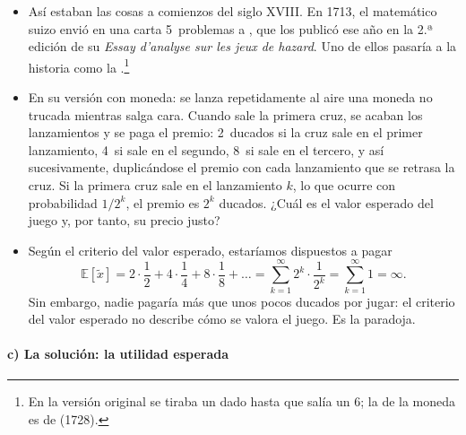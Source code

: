 \documentclass[11pt]{article}
\begin{document}
\begin{itemize}
\item Así estaban las cosas a comienzos del siglo XVIII. En 1713, el matemático suizo  envió en una carta 5~problemas a , que los publicó ese año en la 2.ª edición de su \emph{Essay d'analyse sur les jeux de hazard}\nocite{Peterson2023StPetersburg,MacTutor2026NBernoulli}. Uno de ellos pasaría a la historia como la .\footnote{En la versión original se tiraba un dado hasta que salía un 6; la de la moneda es de  (1728)\nocite{Peterson2023StPetersburg}.}
\item En su versión con moneda: se lanza repetidamente al aire una moneda no trucada mientras salga cara. Cuando sale la primera cruz, se acaban los lanzamientos y se paga el premio: 2~ducados si la cruz sale en el primer lanzamiento, 4~si sale en el segundo, 8~si sale en el tercero, y así sucesivamente, duplicándose el premio con cada lanzamiento que se retrasa la cruz. Si la primera cruz sale en el lanzamiento $k$, lo que ocurre con probabilidad $1/2^k$, el premio es $2^k$ ducados. ¿Cuál es el valor esperado del juego y, por tanto, su precio justo?
\item Según el criterio del valor esperado, estaríamos dispuestos a pagar
  $$\mathbb{E}[\tilde{x}]=2\cdot\frac12+4\cdot\frac14+8\cdot\frac18+\dots=\sum_{k=1}^{\infty}2^k\cdot\frac{1}{2^k}=\sum_{k=1}^{\infty}1=\infty .$$
  Sin embargo, nadie pagaría más que unos pocos ducados por jugar: el criterio del valor esperado no describe cómo se valora el juego. Es la paradoja.
\end{itemize}

\paragraph{c) La solución: la utilidad esperada}
\end{document}
